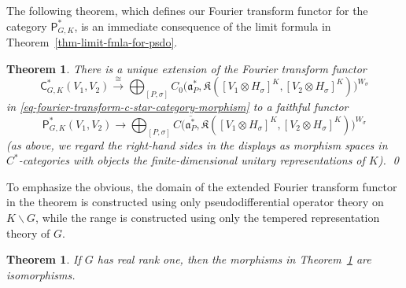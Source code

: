 \documentclass[leqno,11pt]{amsart}
\numberwithin{equation}{subsection}
\theoremstyle{plain}
\newtheorem{theorem}[equation]{Theorem}
\theoremstyle{definition}
\theoremstyle{remark}
\newcommand{\Compact}{\mathfrak{K}}
\newcommand{\PSDO}{\mathsf{P}}
\newcommand{\CC}{\mathsf{C}}
\begin{document}
The following theorem, which defines our Fourier transform functor for the category $\PSDO^*_{G,K}$, is an immediate consequence of the limit formula in Theorem~\ref{thm-limit-fmla-for-psdo}.

\begin{theorem}
\label{thm-unique-extension-of-fourier-transform}
There is a unique extension of the Fourier transform functor 
\[
\CC^*_{G,K}(V_1,V_2) \stackrel \cong \longrightarrow \bigoplus _{[P,\sigma]}
C_0\bigl  (\mathfrak{a}^*_P, \mathfrak{K}([V_1\otimes H_\sigma]^K,[V_2\otimes H_\sigma]^K)\bigr ) ^{W_\sigma}
\]
in \eqref{eq-fourier-transform-c-star-category-morphism} to a faithful functor 
\[
\PSDO^*_{G,K} (V_1, V_2) \longrightarrow \bigoplus_{[P,\sigma]} C \bigl (\overline{\mathfrak{a}^*_P}, \Compact ([V_1\otimes H_\sigma]^K,[V_2\otimes H_\sigma]^K )\bigr )^{W_\sigma} 
\]
\textup{(}as  above, we regard the right-hand sides in the displays as morphism spaces in   $C^*$-categories with objects the finite-dimensional unitary representations of $K$\textup{)}. \qed
\end{theorem}

To emphasize the obvious,   the domain of the extended Fourier transform functor in the theorem is constructed  using only pseudodifferential operator theory on $K \backslash G$, while the range is constructed  using only the tempered representation theory of $G$.

\begin{theorem}
\label{thm-fourier-isomorphism-in-real-rank-one}
  If $G$ has real rank one, then the morphisms in Theorem~\textup{\ref{thm-unique-extension-of-fourier-transform}} are isomorphisms.  
\end{theorem}
\end{document}
